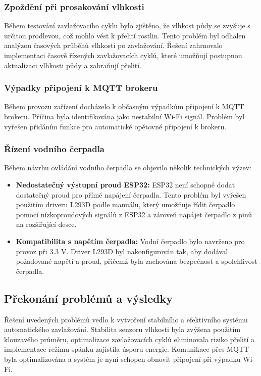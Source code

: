 \documentclass[a4paper, 11pt]{article}
\begin{document}
\subsubsection{Zpoždění při prosakování vlhkosti}
Během testování zavlažovacího cyklu bylo zjištěno, že vlhkost půdy se zvyšuje s určitou prodlevou, což mohlo vést k přelití rostlin. 
Tento problém byl odhalen analýzou časových průběhů vlhkosti po zavlažování. Řešení zahrnovalo implementaci časově řízených zavlažovacích cyklů, 
které umožňují postupnou aktualizaci vlhkosti půdy a zabraňují přelití.

\subsubsection{Výpadky připojení k MQTT brokeru}
Během provozu zařízení docházelo k občasným výpadkům připojení k MQTT brokeru. Příčina byla identifikována jako nestabilní Wi-Fi signál. 
Problém byl vyřešen přidáním funkce pro automatické opětovné připojení k brokeru.

\subsubsection{Řízení vodního čerpadla}
Během návrhu ovládání vodního čerpadla se objevilo několik technických výzev:

\begin{itemize}
    \item \textbf{Nedostatečný výstupní proud ESP32:} ESP32 není schopné dodat dostatečný proud pro přímé napájení čerpadla. Tento problém byl vyřešen použitím driveru L293D podle manuálu\cite{sunfounder_pump_esp32}, který umožňuje řídit čerpadlo pomocí nízkoproudových signálů z ESP32 a zároveň napájet čerpadlo z pinů na rozšiřující desce.
    \item \textbf{Kompatibilita s napětím čerpadla:} Vodní čerpadlo bylo navrženo pro provoz při 3.3 V. Driver L293D byl nakonfigurován tak, aby dodával požadované napětí a proud, přičemž byla zachována bezpečnost a spolehlivost čerpadla.
\end{itemize}

\subsection{Překonání problémů a výsledky}

Řešení uvedených problémů vedlo k vytvoření stabilního a efektivního systému automatického zavlažování. 
Stabilita senzoru vlhkosti byla zvýšena použitím klouzavého průměru, optimalizace zavlažovacích cyklů eliminovala riziko přelití
a implementace režimu spánku zajistila úsporu energie. Komunikace přes MQTT byla optimalizována a systém je nyní schopen obnovit připojení při výpadku Wi-Fi.
\end{document}
